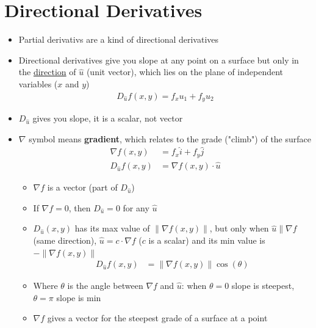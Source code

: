 \documentclass{article}
\begin{document}
\section{Directional Derivatives}
\begin{itemize}
  \item Partial derivativs are a kind of directional derivatives
  \item Directional derivatives give you slope at any point on a surface but only in the \underline{direction} of $\hat{u}$ (unit vector), which lies on the plane of independent variables ($x$ and $y$)
  \begin{align}
    D_{\hat{u}}f(x,y) = f_xu_1 + f_yu_2
  \end{align}
  \item $D_{\hat{u}}$ gives you slope, it is a scalar, not vector
  \item $\nabla$ symbol means \textbf{gradient}, which relates to the grade ("climb") of the surface
  \begin{align}
    \nabla f(x,y) &= f_x\hat{i} + f_y\hat{j} \\
    D_{\hat{u}}f(x,y) &= \nabla f(x,y)\cdot\hat{u}
  \end{align}
  \begin{itemize}
    \item $\nabla f$ is a vector (part of $D_{\hat{u}}$)
    \item If $\nabla f = 0$, then $D_{\hat{u}} = 0$ for any $\hat{u}$
    \item $D_{\hat{u}}(x,y)$ has its max value of $\|\nabla f(x,y)\|$, but only when $\hat{u}\parallel\nabla f$ (same direction), $\hat{u} = c\cdot\nabla f$ ($c$ is a scalar) and its min value is $-\|\nabla f(x,y)\|$
    \begin{align}
      D_{\hat{u}}f(x,y) &= \|\nabla f(x,y)\|\cos(\theta)
    \end{align}
    \item Where $\theta$ is the angle between $\nabla f$ and $\hat{u}$: when $\theta = 0$ slope is steepest, $\theta = \pi$ slope is min
    \item $\nabla f$ gives a vector for the steepest grade of a surface at a point
  \end{itemize}
\end{itemize}
\end{document}
